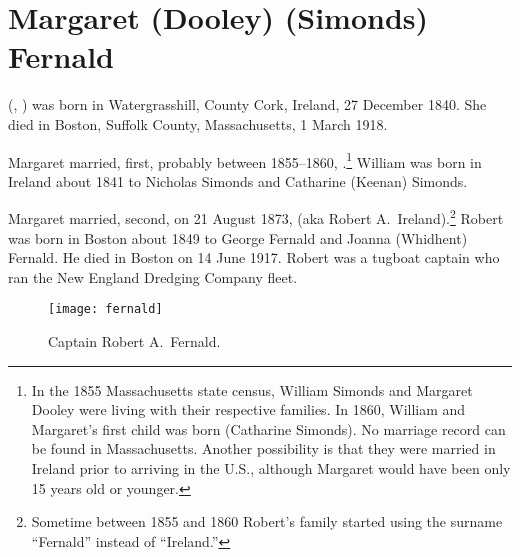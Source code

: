 \section{Margaret (Dooley) (Simonds) Fernald}\label{per:Margaret3Dooley}

 (, ) was born in Watergrasshill, County Cork, Ireland, 27 December 1840.\cite{Margaret3DooleyBaptism:2} She died in Boston, Suffolk County, Massachusetts, 1 March 1918.\cite{Margaret3DooleyDeath} 

Margaret married, first, probably between 1855--1860, .\footnote{In the 1855 Massachusetts state census, William Simonds and Margaret Dooley were living with their respective families. In 1860, William and Margaret's first child was born (Catharine Simonds). No marriage record can be found in Massachusetts. Another possibility is that they were married in Ireland prior to arriving in the U.S., although Margaret would have been only 15 years old or younger.} William was born in Ireland about 1841\cite{Census1855WilliamSimonds} to Nicholas Simonds and Catharine (Keenan) Simonds.\cite{WilliamSimondsDeath}

Margaret married, second, on 21 August 1873, \cite{RobertFernaldMarriage:2} (aka Robert A.\ Ireland\cite{Census1855RobertFernald:1}).\footnote{Sometime between 1855 and 1860 Robert's family started using the surname ``Fernald'' instead of ``Ireland.''} Robert was born in Boston about 1849 to George Fernald and Joanna (Whidhent) Fernald.\cite{RobertFernaldMarriage:3} He died in Boston on 14 June 1917.\cite{RobertFernaldDeath:1} Robert was a tugboat captain who ran the New England Dredging Company fleet.\cite{RobertFernaldDeath:2}

\begin{figure}[htbp]
	\centering
	\texttt{[image: fernald]}
	\caption{Captain Robert A.\ Fernald.}
	\label{fig:RobertFernald}
\end{figure}

